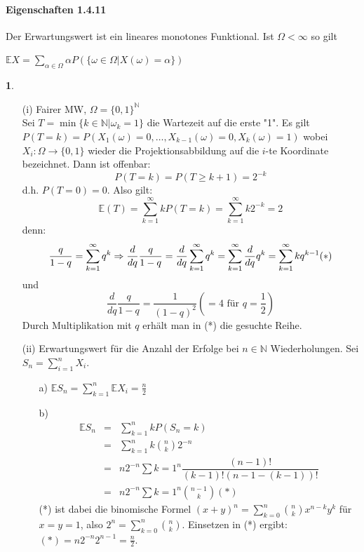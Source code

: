 \documentclass[10pt,a4paper]{report}
\numberwithin{equation}{section}
\numberwithin{figure}{section}
\theoremstyle{plain}
\theoremstyle{definition}
\newtheorem{example}[thm]{\protect\examplename}
\theoremstyle{remark}
\theoremstyle{plain}
\providecommand{\examplename}{Beispiel}
\newcommand{\1}{ \mathbb{1} } %
\begin{document}
\paragraph{Eigenschaften 1.4.11}
Der Erwartungswert ist ein lineares monotones Funktional. Ist $\Omega<\infty$ so gilt
\begin{center}
  $\mathbb{E}X=\sum\limits_{\alpha \in \Omega}\alpha P(\{\omega \in \Omega|X(\omega)=\alpha\})$
\end{center}
\begin{example} \ 
  \begin{itemize}
  \item[(i)] Fairer MW, $\Omega=\{0,1\}^{\mathbb{N}}$\\
    Sei $T=\min\{k\in \mathbb{N}|\omega_k=1\}$ die Wartezeit auf die erste "1".
    Es gilt $P(T=k)=P(X_1(\omega)=0,\dots,X_{k-1}(\omega)=0,X_k(\omega)=1)$ wobei $X_i:\Omega \to \{0,1\}$ wieder die Projektionsabbildung auf die $i$-te Koordinate bezeichnet. Dann ist offenbar:
    \[P(T=k)=P(T\geq k+1)=2^{-k}\] 
    d.h. $P(T=0)=0$. Also gilt:
    \[\mathbb{E}(T)=\sum\limits_{k=1}^\infty kP(T=k)=\sum\limits_{k=1}^\infty k2^{-k}=2\]
    denn: \[\dfrac{q}{1-q}=\sum\limits_{k=1}^\infty q^k \Rightarrow \dfrac{d}{dq}\dfrac{q}{1-q}=\dfrac{d}{dq}\sum\limits_{k=1}^\infty q^k=\sum\limits_{k=1}^\infty \dfrac{d}{dq} q^k=\sum\limits_{k=1}^\infty kq^{k-1} \hfill (*)\]
    und \[\dfrac{d}{dq}\dfrac{q}{1-q}=\dfrac{1}{(1-q)^2} (=4 \text{ für } q=\dfrac{1}{2})\]
    Durch Multiplikation mit $q$ erhält man in (*) die gesuchte Reihe.
  \item[(ii)] Erwartungswert für die Anzahl der Erfolge bei $n \in \mathbb{N}$ Wiederholungen. Sei $S_n=\sum\limits_{i=1}^nX_i$.
    \begin{itemize}
    \item[a)]
      $\mathbb{E}S_n=\sum\limits_{k=1}^n\mathbb{E}X_i=\frac{n}{2}$
    \item[b)]\begin{eqnarray*}
        \mathbb{E}S_n&=&\sum\limits_{k=1}^nkP(S_n=k)\\
        &=& \sum\limits_{k=1}^nk\binom{n}{k}2^{-n}\\
        &=& n 2^{-n} \sum\limits{k=1}^n\dfrac{(n-1)!}{(k-1)!(n-1-(k-1))!}\\
        &=& n 2^{-n} \sum\limits{k=1}^n \binom{n-1}{k} (*)
      \end{eqnarray*}
      (*) ist dabei die binomische Formel $(x+y)^n=\sum\limits_{k=0}^n\binom{n}{k}x^{n-k}y^k$ für $x=y=1$, also $2^n=\sum\limits_{k=0}^n\binom{n}{k}$. Einsetzen in (*) ergibt: $(*)=n2^{-n}2^{n-1}=\frac{n}{2}$.
    \end{itemize}
  \end{itemize}

\end{example}
\end{document}
